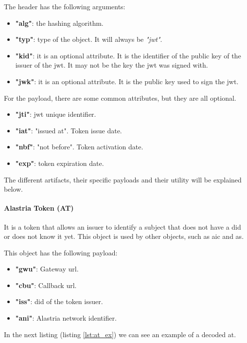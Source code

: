 The header has the following arguments:
\begin{itemize}
    \item \textbf{"alg"}: the hashing algorithm.
    \item \textbf{"typ"}: type of the object. It will always be \textit{"\acrshort{jwt}"}.
    \item \textbf{"kid"}: it is an optional attribute. It is the identifier of the public key of the issuer of the \acrshort{jwt}. It may not be the key the \acrshort{jwt} was signed with.
    \item \textbf{"jwk"}: it is an optional attribute. It is the public key used to sign the \acrshort{jwt}.
\end{itemize}
For the payload, there are some common attributes, but they are all optional.
\begin{itemize}
    \item \textbf{"jti"}: \acrshort{jwt} unique identifier.
    \item \textbf{"iat"}: "issued at". Token issue date.
    \item \textbf{"nbf"}: "not before". Token activation date.
    \item \textbf{"exp"}: token expiration date.
\end{itemize}
The different artifacts, their specific payloads and their utility will be explained below.

\paragraph{Alastria Token (AT)}
It is a token that allows an issuer to identify a subject that does not have a \acrshort{did} or does not know it yet. This object is used by other objects, such as \acrfull{aic} and \acrfull{as}.

This object has the following payload:
\begin{itemize}
    \item \textbf{"gwu"}: Gateway \acrshort{url}.
    \item \textbf{"cbu"}: Callback \acrshort{url}.
    \item \textbf{"iss"}: \acrshort{did} of the token issuer.
    \item \textbf{"ani"}: Alastria network identifier.
\end{itemize}
In the next listing (listing \ref{lst:at_ex}) we can see an example of a decoded \acrlong{at}.


